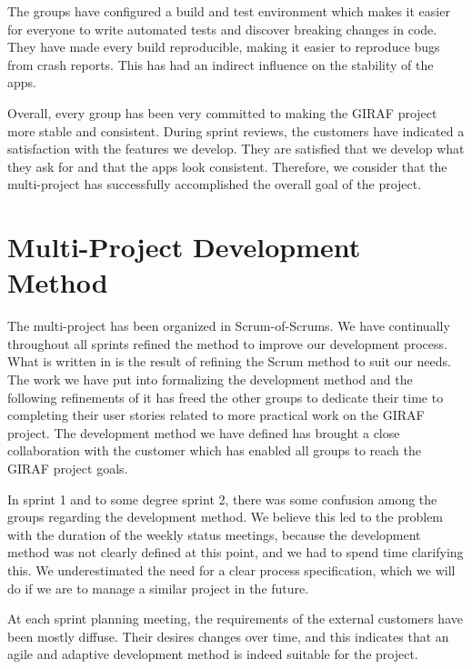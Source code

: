 The \bd{} groups have configured a build and test environment which makes it easier for everyone to write automated tests and discover breaking changes in code. They have made every build reproducible, making it easier to reproduce bugs from crash reports. This has had an indirect influence on the stability of the apps.

Overall, every group has been very committed to making the GIRAF project more stable and consistent. During sprint reviews, the customers have indicated a satisfaction with the features we develop. They are satisfied that we develop what they ask for and that the apps look consistent. Therefore, we consider that the multi-project has successfully accomplished the overall goal of the project.

\section{Multi-Project Development Method}\label{conc:multi_project_process_eval}
The multi-project has been organized in Scrum-of-Scrums. We have continually throughout all sprints refined the method to improve our development process. What is written in  is the result of refining the Scrum method to suit our needs. The work we have put into formalizing the development method and the following refinements of it has freed the other groups to dedicate their time to completing their user stories related to more practical work on the GIRAF project. The development method we have defined has brought a close collaboration with the customer which has enabled all groups to reach the GIRAF project goals.

In sprint 1 and to some degree sprint 2, there was some confusion among the groups regarding the development method. We believe this led to the problem with the duration of the weekly status meetings, because the development method was not clearly defined at this point, and we had to spend time clarifying this. We underestimated the need for a clear process specification, which we will do if we are to manage a similar project in the future. 

At each sprint planning meeting, the requirements of the external customers have been mostly diffuse. Their desires changes over time, and this indicates that an agile and adaptive development method is indeed suitable for the project.


